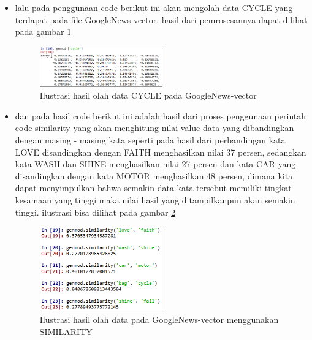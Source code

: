 \begin{enumerate}
\begin{itemize}
\item  lalu pada penggunaan code berikut ini akan mengolah data CYCLE yang terdapat pada file GoogleNews-vector, hasil dari pemrosesannya dapat dilihat pada gambar \ref{fig17}
\begin{figure}[!htbp]
	\centering
	\includegraphics[width=0.5\textwidth]{figures/fathi/chapter5/hari2/12}
	\caption{Ilustrasi hasil olah data CYCLE pada GoogleNews-vector}
	\label{fig17}
\end{figure}

\item  dan pada hasil code berikut ini adalah hasil dari proses penggunaan perintah code similarity yang akan menghitung nilai value data yang dibandingkan dengan masing - masing kata seperti pada hasil dari perbandingan kata LOVE disandingkan dengan FAITH menghasilkan nilai 37 persen, sedangkan kata WASH dan SHINE menghasilkan nilai 27 persen dan kata CAR yang disandingkan dengan kata MOTOR menghasilkan 48 persen, dimana kita dapat menyimpulkan bahwa semakin data kata tersebut memiliki tingkat kesamaan yang tinggi maka nilai hasil yang ditampilkanpun akan semakin tinggi. ilustrasi bisa dilihat pada gambar \ref{fig18}
\begin{figure}[!htbp]
	\centering
	\includegraphics[width=0.5\textwidth]{figures/fathi/chapter5/hari2/13}
	\caption{Ilustrasi hasil olah data  pada GoogleNews-vector menggunakan SIMILARITY}
	\label{fig18}
\end{figure}
\end{itemize}


\end{enumerate}
